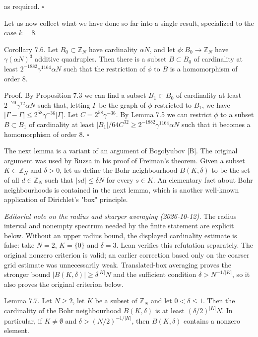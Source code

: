 \documentclass[10pt]{article}
\begin{document}
as required. \(\square\)

Let us now collect what we have done so far into a single result, specialized to the case $k=8$.

Corollary 7.6. Let $B_{0} \subset \mathbb{Z}_{N}$ have cardinality $\alpha N$, and let $\phi: B_{0} \rightarrow \mathbb{Z}_{N}$ have $\gamma(\alpha N)^{3}$ additive quadruples. Then there is a subset $B \subset B_{0}$ of cardinality at least $2^{-1882} \gamma^{1164} \alpha N$ such that the restriction of $\phi$ to $B$ is a homomorphism of order 8.

Proof. By Proposition 7.3 we can find a subset $B_{1} \subset B_{0}$ of cardinality at least $2^{-20} \gamma^{12} \alpha N$ such that, letting $\Gamma$ be the graph of $\phi$ restricted to $B_{1}$, we have $|\Gamma-\Gamma| \leqslant 2^{58} \gamma^{-36}|\Gamma|$. Let $C=2^{58} \gamma^{-36}$. By Lemma 7.5 we can restrict $\phi$ to a subset $B \subset B_{1}$ of cardinality at least $\left|B_{1}\right| / 64 C^{32} \geqslant 2^{-1882} \gamma^{1164} \alpha N$ such that it becomes a homomorphism of order 8. \(\square\)

The next lemma is a variant of an argument of Bogolyubov [B]. The original argument was used by Ruzsa in his proof of Freiman's theorem. Given a subset $K \subset \mathbb{Z}_{N}$ and $\delta>0$, let us define the Bohr neighbourhood $B(K, \delta)$ to be the set of all $d \in \mathbb{Z}_{N}$ such that $|s d| \leqslant \delta N$ for every $s \in K$. An elementary fact about Bohr neighbourhoods is contained in the next lemma, which is another well-known application of Dirichlet's "box" principle.

\emph{Editorial note on the radius and sharper averaging (2026-10-12).}
The radius interval and nonempty spectrum needed by the finite statement
are explicit below. Without an upper radius bound, the displayed
cardinality estimate is false: take $N=2$, $K=\{0\}$ and $\delta=3$.
Lean verifies this refutation separately. The original nonzero criterion
is valid; an earlier correction based only on the coarser grid estimate
was unnecessarily weak. Translated-box averaging proves the stronger
bound $|B(K,\delta)|\geqslant\delta^{|K|}N$ and the sufficient condition
$\delta>N^{-1/|K|}$, so it also proves the original criterion below.

Lemma 7.7. Let $N\geqslant2$, let $K$ be a subset of $\mathbb Z_N$ and
let $0<\delta\leqslant1$. Then the cardinality of the Bohr neighbourhood
$B(K,\delta)$ is at least $(\delta/2)^{|K|}N$. In particular, if
$K\ne\emptyset$ and $\delta>(N/2)^{-1/|K|}$, then $B(K,\delta)$ contains
a nonzero element.
\end{document}
